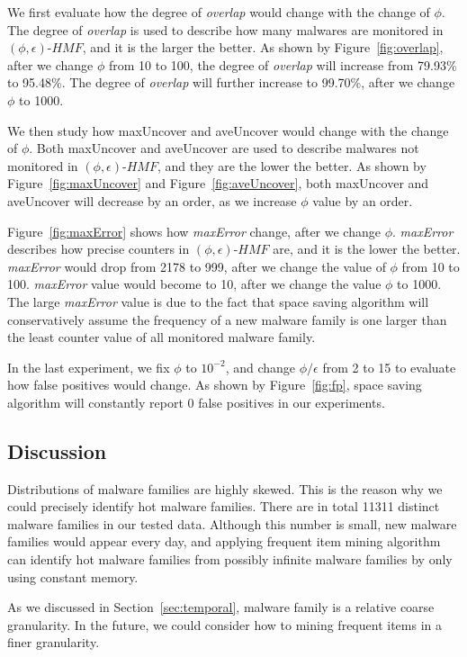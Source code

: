 We first evaluate how the degree of \textit{overlap} would change with the change of $\phi$. 
The degree of \textit{overlap} is used to describe how many malwares are monitored in $(\phi, \epsilon)\mbox{-}HMF$, and it is the larger the better. 
As shown by Figure~\ref{fig:overlap}, after we change $\phi$ from 10 to 100, the degree of \textit{overlap} will increase from 79.93\% to 95.48\%. 
The degree of \textit{overlap} will further increase to 99.70\%, after we change $\phi$ to 1000. 

We then study how maxUncover and aveUncover would change with the change of $\phi$.
Both maxUncover and aveUncover are used to describe malwares not monitored in $(\phi, \epsilon)\mbox{-}HMF$, 
and they are the lower the better. As shown by Figure~\ref{fig:maxUncover} and Figure~\ref{fig:aveUncover}, 
both maxUncover and aveUncover will decrease by an order, as we increase $\phi$ value by an order. 

Figure~\ref{fig:maxError} shows how \textit{maxError} change, after we change $\phi$. 
\textit{maxError} describes how precise counters in $(\phi, \epsilon)\mbox{-}HMF$ are, 
and it is the lower the better. \textit{maxError} would drop from 2178 to 999, 
after we change the value of $\phi$ from 10 to 100. 
\textit{maxError} value would become to 10, after we change the value $\phi$ to 1000. 
The large \textit{maxError} value is due to the fact that space saving algorithm 
will conservatively assume the frequency of a new malware family is one larger than the least counter value of all monitored malware family. 

In the last experiment, we fix $\phi$ to $10^{-2}$, 
and change $\phi/\epsilon$ from 2 to 15 to evaluate how false positives would change. 
As shown by Figure~\ref{fig:fp}, space saving algorithm will constantly report 0 false positives in our experiments. 

\subsection{Discussion}
Distributions of malware families are highly skewed. 
This is the reason why we could precisely identify hot malware families. 
There are in total 11311 distinct malware families in our tested data. 
Although this number is small, new malware families would appear every day, 
and applying frequent item mining algorithm can identify hot malware families from possibly 
infinite malware families by only using constant memory. 

As we discussed in Section~\ref{sec:temporal}, malware family is a relative coarse granularity.
In the future, we could consider how to mining frequent items in a finer granularity. 
